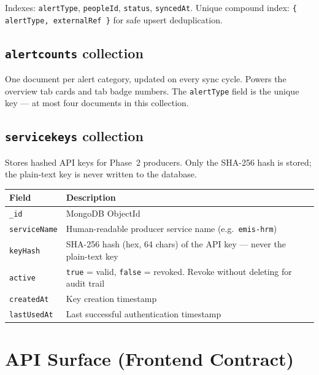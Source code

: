 \documentclass[11pt]{article}
\begin{document}
Indexes: \texttt{alertType}, \texttt{peopleId}, \texttt{status}, \texttt{syncedAt}.
Unique compound index: \texttt{\{ alertType, externalRef \}} for safe upsert deduplication.

\subsection{\texttt{alertcounts} collection}

One document per alert category, updated on every sync cycle. Powers the overview tab cards
and tab badge numbers. The \texttt{alertType} field is the unique key --- at most four documents
in this collection.

\subsection{\texttt{servicekeys} collection}

Stores hashed API keys for Phase~2 producers. Only the SHA-256 hash is stored; the
plain-text key is never written to the database.

\begin{table}[h]
\small
\begin{tabularx}{\textwidth}{l X}
\toprule
\textbf{Field} & \textbf{Description} \\
\midrule
\texttt{\_id} & MongoDB ObjectId \\
\texttt{serviceName} & Human-readable producer service name (e.g.\ \texttt{emis-hrm}) \\
\texttt{keyHash} & SHA-256 hash (hex, 64 chars) of the API key --- never the plain-text key \\
\texttt{active} & \texttt{true} = valid, \texttt{false} = revoked. Revoke without deleting for audit trail \\
\texttt{createdAt} & Key creation timestamp \\
\texttt{lastUsedAt} & Last successful authentication timestamp \\
\bottomrule
\end{tabularx}
\end{table}

\section{API Surface (Frontend Contract)}
\end{document}
